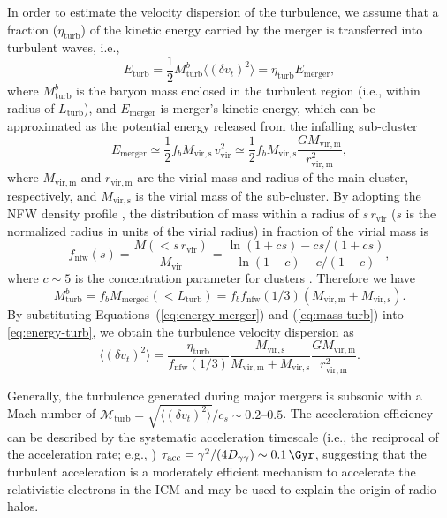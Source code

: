 \documentclass[twocolumn]{aastex62}
\newcommand{\R}[1]{\mathrm{#1}}
\begin{document}
In order to estimate the velocity dispersion of the turbulence, we assume
that a fraction ($\eta_{\R{turb}}$) of the kinetic energy carried by the
merger is transferred into turbulent waves, i.e.,
\begin{equation}
  \label{eq:energy-turb}
  E_{\R{turb}} = \frac{1}{2} M_{\R{turb}}^b
    \langle (\delta{v_t})^2 \rangle = \eta_{\R{turb}} E_{\R{merger}},
\end{equation}
where
$M_{\R{turb}}^b$ is the baryon mass enclosed in the turbulent region
(i.e., within radius of $L_{\R{turb}}$),
and $E_{\R{merger}}$ is merger's kinetic energy, which can be approximated
as the potential energy released from the infalling sub-cluster
\begin{equation}
  \label{eq:energy-merger}
  E_{\R{merger}} \simeq \frac{1}{2} f_b M_{\R{vir,s}} \,v^2_{\R{vir}}
    \simeq \frac{1}{2} f_b M_{\R{vir,s}}
    \frac{G M_{\R{vir,m}}}{r^2_{\R{vir,m}}},
\end{equation}
where
$M_{\R{vir,m}}$ and $r_{\R{vir,m}}$ are the virial mass and radius of the
main cluster, respectively, and $M_{\R{vir,s}}$ is the virial mass of the
sub-cluster.
By adopting the NFW density profile \citep{navarro1997}, the distribution
of mass within a radius of $s \,r_{\R{vir}}$ ($s$ is the normalized radius
in units of the virial radius) in fraction of the virial mass is
\begin{equation}
  \label{eq:mass-dist-nfw}
  f_{\R{nfw}}(s) = \frac{M(< s \,r_{\R{vir}})}{M_{\R{vir}}} =
    \frac{\ln(1 + c s) - c s / (1 + c s)}{\ln(1 + c) - c / (1 + c)},
\end{equation}
where
$c \sim 5$ is the concentration parameter for clusters \citep{lokas2001}.
Therefore we have
\begin{equation}
  \label{eq:mass-turb}
  M_{\R{turb}}^b = f_b M_{\R{merged}}(<L_{\R{turb}})
    = f_b f_{\R{nfw}}(1/3) (M_{\R{vir,m}} + M_{\R{vir,s}}).
\end{equation}
By substituting Equations~(\ref{eq:energy-merger}) and (\ref{eq:mass-turb})
into \autoref{eq:energy-turb}, we obtain the turbulence velocity dispersion
as
\begin{equation}
  \label{eq:turb-velocity-dispersion}
  \langle (\delta{v_t})^2 \rangle =
    \frac{\eta_{\R{turb}}}{f_{\R{nfw}}(1/3)}
    \frac{M_{\R{vir,s}}}{M_{\R{vir,m}} + M_{\R{vir,s}}}
    \frac{G M_{\R{vir,m}}}{r^2_{\R{vir,m}}}.
\end{equation}

Generally, the turbulence generated during major mergers is subsonic
with a Mach number of
$\mathcal{M}_{\R{turb}} = \sqrt{\langle (\delta{v_t})^2 \rangle} / c_s
  \sim \numrange{0.2}{0.5}$.
The acceleration efficiency can be described by the systematic
acceleration timescale (i.e., the reciprocal of the acceleration rate;
e.g., \citealt{brunetti2011})
$\tau_{\R{acc}} = \gamma^2 / (4 D_{\gamma\gamma}) \sim \SI{0.1}{\Gyr}$,
suggesting that the turbulent acceleration is a moderately efficient
mechanism to accelerate the relativistic electrons in the ICM and
may be used to explain the origin of radio halos.
\end{document}
